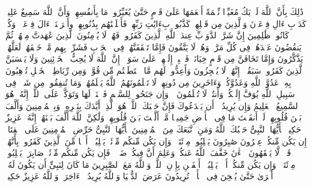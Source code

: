 \stopbuffer
\startbuffer[\q:8:53]
ذَٰلِكَ بِأَنَّ ٱللَّهَ لَمۡ یَكُ مُغَیِّرࣰا نِّعۡمَةً أَنۡعَمَهَا عَلَىٰ قَوۡمٍ حَتَّىٰ یُغَیِّرُوا۟ مَا بِأَنفُسِهِمۡ وَأَنَّ ٱللَّهَ سَمِیعٌ عَلِیمࣱ%
\stopbuffer
\startbuffer[\q:8:54]
كَدَأۡبِ ءَالِ فِرۡعَوۡنَ وَٱلَّذِینَ مِن قَبۡلِهِمۡۚ كَذَّبُوا۟ بِءَایَٰتِ رَبِّهِمۡ فَأَهۡلَكۡنَٰهُم بِذُنُوبِهِمۡ وأَغۡرَقۡنَاۤ ءَالَ فِرۡعَوۡنَۚ وَكُلࣱّ كَانُوا۟ ظَٰلِمِینَ%
\stopbuffer
\startbuffer[\q:8:55]
إِنَّ شَرَّ ٱلدَّوَاۤبِّ عِندَ ٱللَّهِ ٱلَّذِینَ كَفَرُوا۟ فَهُمۡ لَا یُؤۡمِنُونَ%
\stopbuffer
\startbuffer[\q:8:56]
ٱلَّذِینَ عَٰهَدتَّ مِنۡهُمۡ ثُمَّ یَنقُضُونَ عَهۡدَهُمۡ فِی كُلِّ مَرَّةࣲ وَهُمۡ لَا یَتَّقُونَ%
\stopbuffer
\startbuffer[\q:8:57]
فَإِمَّا تَثۡقَفَنَّهُمۡ فِی ٱلۡحَرۡبِ فَشَرِّدۡ بِهِم مَّنۡ خَلۡفَهُمۡ لَعَلَّهُمۡ یَذَّكَّرُونَ%
\stopbuffer
\startbuffer[\q:8:58]
وَإِمَّا تَخَافَنَّ مِن قَوۡمٍ خِیَانَةࣰ فَٱنۢبِذۡ إِلَیۡهِمۡ عَلَىٰ سَوَاۤءٍۚ إِنَّ ٱللَّهَ لَا یُحِبُّ ٱلۡخَاۤئِنِینَ%
\stopbuffer
\startbuffer[\q:8:59]
وَلَا یَحۡسَبَنَّ ٱلَّذِینَ كَفَرُوا۟ سَبَقُوۤا۟ۚ إِنَّهُمۡ لَا یُعۡجِزُونَ%
\stopbuffer
\startbuffer[\q:8:60]
وَأَعِدُّوا۟ لَهُم مَّا ٱسۡتَطَعۡتُم مِّن قُوَّةࣲ وَمِن رِّبَاطِ ٱلۡخَیۡلِ تُرۡهِبُونَ بِهِۦ عَدُوَّ ٱللَّهِ وَعَدُوَّكُمۡ وَءَاخَرِینَ مِن دُونِهِمۡ لَا تَعۡلَمُونَهُمُ ٱللَّهُ یَعۡلَمُهُمۡۚ وَمَا تُنفِقُوا۟ مِن شَیۡءࣲ فِی سَبِیلِ ٱللَّهِ یُوَفَّ إِلَیۡكُمۡ وَأَنتُمۡ لَا تُظۡلَمُونَ%
\stopbuffer
\startbuffer[\q:8:61]
۞ وَإِن جَنَحُوا۟ لِلسَّلۡمِ فَٱجۡنَحۡ لَهَا وَتَوَكَّلۡ عَلَى ٱللَّهِۚ إِنَّهُۥ هُوَ ٱلسَّمِیعُ ٱلۡعَلِیمُ%
\stopbuffer
\startbuffer[\q:8:62]
وَإِن یُرِیدُوۤا۟ أَن یَخۡدَعُوكَ فَإِنَّ حَسۡبَكَ ٱللَّهُۚ هُوَ ٱلَّذِیۤ أَیَّدَكَ بِنَصۡرِهِۦ وَبِٱلۡمُؤۡمِنِینَ%
\stopbuffer
\startbuffer[\q:8:63]
وَأَلَّفَ بَیۡنَ قُلُوبِهِمۡۚ لَوۡ أَنفَقۡتَ مَا فِی ٱلۡأَرۡضِ جَمِیعࣰا مَّاۤ أَلَّفۡتَ بَیۡنَ قُلُوبِهِمۡ وَلَٰكِنَّ ٱللَّهَ أَلَّفَ بَیۡنَهُمۡۚ إِنَّهُۥ عَزِیزٌ حَكِیمࣱ%
\stopbuffer
\startbuffer[\q:8:64]
یَٰۤأَیُّهَا ٱلنَّبِیُّ حَسۡبُكَ ٱللَّهُ وَمَنِ ٱتَّبَعَكَ مِنَ ٱلۡمُؤۡمِنِینَ%
\stopbuffer
\startbuffer[\q:8:65]
یَٰۤأَیُّهَا ٱلنَّبِیُّ حَرِّضِ ٱلۡمُؤۡمِنِینَ عَلَى ٱلۡقِتَالِۚ إِن یَكُن مِّنكُمۡ عِشۡرُونَ صَٰبِرُونَ یَغۡلِبُوا۟ مِا۟ئَتَیۡنِۚ وَإِن یَكُن مِّنكُم مِّا۟ئَةࣱ یَغۡلِبُوۤا۟ أَلۡفࣰا مِّنَ ٱلَّذِینَ كَفَرُوا۟ بِأَنَّهُمۡ قَوۡمࣱ لَّا یَفۡقَهُونَ%
\stopbuffer
\startbuffer[\q:8:66]
ٱلۡءَٰنَ خَفَّفَ ٱللَّهُ عَنكُمۡ وَعَلِمَ أَنَّ فِیكُمۡ ضَعۡفࣰاۚ فَإِن یَكُن مِّنكُم مِّا۟ئَةࣱ صَابِرَةࣱ یَغۡلِبُوا۟ مِا۟ئَتَیۡنِۚ وَإِن یَكُن مِّنكُمۡ أَلۡفࣱ یَغۡلِبُوۤا۟ أَلۡفَیۡنِ بِإِذۡنِ ٱللَّهِۗ وَٱللَّهُ مَعَ ٱلصَّٰبِرِینَ%
\stopbuffer
\startbuffer[\q:8:67]
مَا كَانَ لِنَبِیٍّ أَن یَكُونَ لَهُۥۤ أَسۡرَىٰ حَتَّىٰ یُثۡخِنَ فِی ٱلۡأَرۡضِۚ تُرِیدُونَ عَرَضَ ٱلدُّنۡیَا وَٱللَّهُ یُرِیدُ ٱلۡءَاخِرَةَۗ وَٱللَّهُ عَزِیزٌ حَكِیمࣱ%
